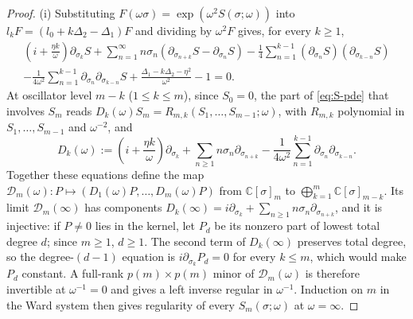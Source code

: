 \documentclass[twoside,10pt]{article}
\numberwithin{equation}{section}
\theoremstyle{slbody}
\theoremstyle{definition}
\theoremstyle{remark}
\begin{document}
\begin{proof}
(i) Substituting \(F(\omega\sigma)=\exp(\omega^2S(\sigma;\omega))\)
into \(l_kF=(l_0+k\Delta_2-\Delta_1)F\) and dividing by \(\omega^2 F\)
gives, for every \(k\geq1\),
\begin{multline}\label{eq:S-pde}
 \left(i+\frac{\eta k}{\omega}\right)\partial_{\sigma_k}S
 +\sum_{n=1}^\infty n\sigma_n(\partial_{\sigma_{n+k}}S-\partial_{\sigma_n}S)
 -\frac14\sum_{n=1}^{k-1}(\partial_{\sigma_n}S)(\partial_{\sigma_{k-n}}S)\\
 -\frac{1}{4\omega^2}\sum_{n=1}^{k-1}\partial_{\sigma_n}\partial_{\sigma_{k-n}}S
 +\frac{\Delta_1-k\Delta_2-\eta^2}{\omega^2}-1=0.
\end{multline}
At oscillator level \(m-k\) (\(1\leq k\leq m\)), since \(S_0=0\), the part of
\eqref{eq:S-pde} that involves \(S_m\) reads
\(D_k(\omega)S_m=R_{m,k}(S_1,\dots,S_{m-1};\omega)\), with \(R_{m,k}\)
polynomial in \(S_1,\dots,S_{m-1}\) and \(\omega^{-2}\), and
\[
 D_k(\omega):=\left(i+\frac{\eta k}{\omega}\right)\partial_{\sigma_k}
 +\sum_{n\geq1}n\sigma_n\partial_{\sigma_{n+k}}
 -\frac{1}{4\omega^2}\sum_{n=1}^{k-1}\partial_{\sigma_n}\partial_{\sigma_{k-n}}.
\]
Together these equations define the map
\(\mathcal D_m(\omega)\colon P\mapsto(D_1(\omega)P,\dots,D_m(\omega)P)\) from
\(\mathbb C[\sigma]_m\) to \(\bigoplus_{k=1}^m\mathbb C[\sigma]_{m-k}\).  Its limit
\(\mathcal D_m(\infty)\) has components
\(D_k(\infty)=i\partial_{\sigma_k}+\sum_{n\geq1}n\sigma_n\partial_{\sigma_{n+k}}\),
and it is injective: if \(P\neq0\) lies in the kernel, let \(P_d\) be its
nonzero part of lowest total degree \(d\); since \(m\geq1\), \(d\geq1\).  The
second term of \(D_k(\infty)\) preserves total degree, so the degree-\((d-1)\)
equation is \(i\partial_{\sigma_k}P_d=0\) for every \(k\leq m\), which would make
\(P_d\) constant.  A full-rank \(p(m)\times p(m)\) minor of \(\mathcal D_m(\omega)\)
is therefore invertible at \(\omega^{-1}=0\) and gives a left inverse regular
in \(\omega^{-1}\).
Induction on \(m\) in the Ward system then gives regularity of every
\(S_m(\sigma;\omega)\) at \(\omega=\infty\).


\end{proof}
\end{document}

